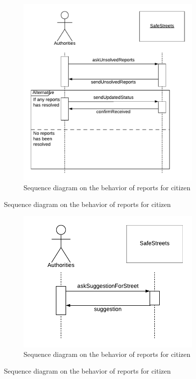 \documentclass[12pt,a4paper]{report}
\begin{document}
			\begin{figure}[H]
				\begin{subfigure}{\textwidth}
					\includegraphics[scale = 0.75, center]{EvaluateSequenceDiagram}
					\caption{Sequence diagram on the behavior of reports for citizen}
				\end{subfigure}
			\end{figure}

			\begin{figure}[H]
				\begin{subfigure}{\textwidth}
					\includegraphics[scale = 0.75, center]{SuggestionSequenceDiagram}
					\caption{Sequence diagram on the behavior of reports for citizen}
				\end{subfigure}
			\end{figure}
\end{document}
